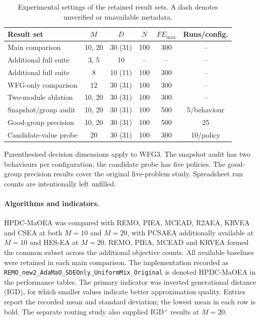 \documentclass[final,5p,times,twocolumn]{elsarticle}
\begin{document}
\begin{table}[t]
\centering
\caption{Experimental settings of the retained result sets. A dash denotes unverified or unavailable metadata.}
\label{tab:exp:settings}
\footnotesize
\setlength{\tabcolsep}{3pt}
\renewcommand{\arraystretch}{1.12}
\begin{tabular}{lccccc}
\toprule
Result set & $M$ & $D$ & $N$ & $FE_{\max}$ & Runs/config. \\
\midrule
Main comparison & 10, 20 & 30 (31) & 100 & 300 & -- \\
Additional full suite & 3, 5 & 10 & -- & -- & -- \\
Additional full suite & 8 & 10 (11) & 100 & 300 & -- \\
WFG-only comparison & 12 & 30 (31) & 100 & 300 & -- \\
Two-module ablation & 10, 20 & 30 (31) & 100 & 300 & -- \\
Snapshot/group audit & 10, 20 & 30 (31) & 100 & 500 & 5/behaviour \\
Good-group precision & 10, 20 & 30 (31) & 100 & 500 & 25 \\
Candidate-value probe & 20 & 30 (31) & 100 & 300 & 10/policy \\
\bottomrule
\end{tabular}
\par\smallskip
\begin{minipage}{\linewidth}
\scriptsize Parenthesised decision dimensions apply to WFG3. The snapshot audit has two behaviours per configuration; the candidate probe has five policies. The good-group precision results cover the original five-problem study. Spreadsheet run counts are intentionally left unfilled.
\end{minipage}
\end{table}

\paragraph{Algorithms and indicators.}
HPDC-MaOEA was compared with REMO, PIEA, MCEAD, R2AEA, KRVEA and CSEA at both
$M=10$ and $M=20$, with PCSAEA additionally available at $M=10$ and HES-EA at
$M=20$. REMO, PIEA, MCEAD and KRVEA formed the common subset across the
additional objective counts. All available baselines were retained in each
main comparison. The implementation recorded as
\texttt{REMO\_new2\_AdaMaO\_SDEOnly\_UniformMix\_Original} is denoted
HPDC-MaOEA in the performance tables.
The primary indicator was inverted generational distance (IGD), for which
smaller values indicate better approximation quality. Entries report the
recorded mean and standard deviation; the lowest mean in each row is bold.
The separate routing study also supplied IGD$^+$ results at $M=20$.
\end{document}
